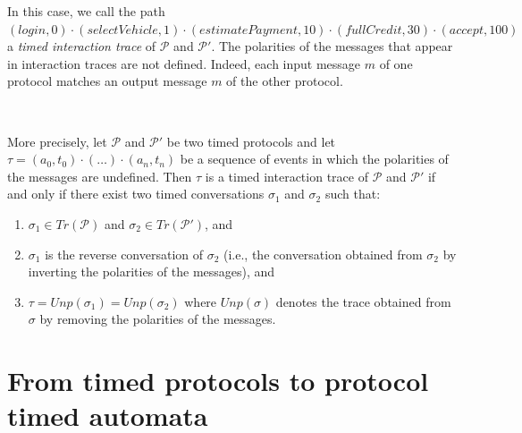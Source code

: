 \begin{sloppypar}
In this case, we call the path $(login, 0) \cdot (selectVehicle, 1) \cdot (estimatePayment, 10) \cdot (fullCredit, 30) \cdot (accept, 100)$ a \emph{timed interaction trace} of $\mathcal{P}$ and $\mathcal{P'}$. The polarities of the messages that appear in interaction traces are not defined. Indeed, each input message $m$ of one protocol matches an output message $m$ of the other protocol.
\end{sloppypar}\

More precisely, let $\mathcal{P}$ and $\mathcal{P}'$ be two timed protocols and let $\tau = (a_0, t_0) \cdot (\ldots) \cdot (a_n, t_n)$ be a sequence of events in which the polarities of the messages are undefined. Then $\tau$ is a timed interaction trace of $\mathcal{P}$ and $\mathcal{P}'$ if and only if there exist two timed conversations $\sigma_1$ and $\sigma_2$ such that:
\begin{enumerate}

    \item $\sigma_1 \in Tr(\mathcal{P})$ and  $\sigma_2 \in Tr(\mathcal{P}')$, and

    \item $\sigma_1$ is the reverse conversation of $\sigma_2$ (i.e., the conversation obtained from $\sigma_2$ by inverting the polarities of the messages), and

    \item $\tau = Unp(\sigma_1) = Unp(\sigma_2)$ where $Unp(\sigma)$ denotes the trace obtained from $\sigma$ by removing the polarities of the messages.

\end{enumerate}


\section{From timed protocols to protocol timed automata}


